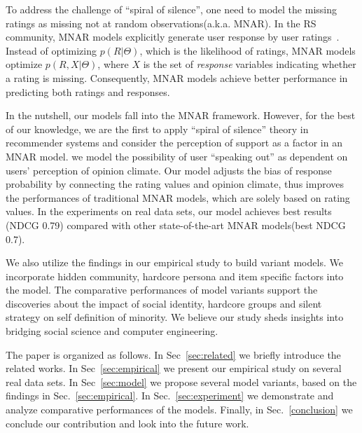 \documentclass{sig-alternate}
\begin{document}
To address the challenge of ``spiral of silence'', one need to model the missing ratings as missing not at random observations(a.k.a. MNAR). In the RS community,  MNAR models explicitly generate user response by user ratings~\cite{Hernandez-Lobato2014Probabilistic,Steck2010Training,Marlin2009Collaborative}. Instead of optimizing $p(R|\Theta)$, which is the likelihood of ratings, MNAR models optimize $p(R,X|\Theta)$, where $X$ is the set of \textit{response} variables indicating whether a rating is missing. Consequently, MNAR models achieve better performance in predicting both ratings and responses.

In the nutshell, our models fall into the MNAR framework. However, for the best of our knowledge, we are the first to apply ``spiral of silence'' theory in recommender systems and consider the perception of support as a factor in an MNAR model. we model the possibility of user ``speaking out'' as dependent on users' perception of opinion climate.  Our model adjusts the bias of response probability by connecting the rating values and opinion climate, thus improves the performances of traditional MNAR models, which are solely based on rating values.  In the experiments on real data sets, our model achieves best results (NDCG 0.79) compared with other state-of-the-art MNAR models(best NDCG 0.7).

We also utilize the findings in our empirical study to build variant models. We incorporate hidden community, hardcore persona and item specific factors into the model. The comparative performances of model variants support the discoveries about the impact of social identity, hardcore groups and silent strategy on self definition of minority. We believe our study sheds insights into bridging social science and computer engineering.

The paper is organized as follows. In Sec~\ref{sec:related} we briefly introduce the related works. In Sec~\ref{sec:empirical} we present our empirical study on several real data sets. In Sec~\ref{sec:model} we propose several model variants, based on the findings in Sec.~\ref{sec:empirical}. In Sec.~\ref{sec:experiment} we demonstrate and analyze comparative performances of the models. Finally, in Sec.~\ref{conclusion} we conclude our contribution and look into the future work.
\end{document}
